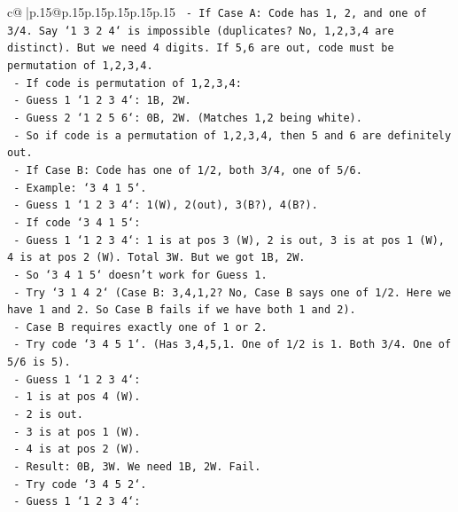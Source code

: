 \documentclass{article}
\begin{document}
{\begin{supertabular}{c@{$\;$}|p{.15\linewidth}@{}p{.15\linewidth}p{.15\linewidth}p{.15\linewidth}p{.15\linewidth}p{.15\linewidth}}
{{{\texttt{            {-} If Case A: Code has 1, 2, and one of 3/4. Say `1 3 2 4` is impossible (duplicates? No, 1,2,3,4 are distinct). But we need 4 digits. If 5,6 are out, code must be permutation of 1,2,3,4.} \\
\texttt{            {-} If code is permutation of 1,2,3,4:} \\
\texttt{                {-} Guess 1 `1 2 3 4`: 1B, 2W.} \\
\texttt{                {-} Guess 2 `1 2 5 6`: 0B, 2W. (Matches 1,2 being white).} \\
\texttt{                {-} So if code is a permutation of 1,2,3,4, then 5 and 6 are definitely out.} \\
\texttt{            {-} If Case B: Code has one of 1/2, both 3/4, one of 5/6.} \\
\texttt{                {-} Example: `3 4 1 5`.} \\
\texttt{                {-} Guess 1 `1 2 3 4`: 1(W), 2(out), 3(B?), 4(B?).} \\
\texttt{                    {-} If code `3 4 1 5`:} \\
\texttt{                    {-} Guess 1 `1 2 3 4`: 1 is at pos 3 (W), 2 is out, 3 is at pos 1 (W), 4 is at pos 2 (W). Total 3W. But we got 1B, 2W.} \\
\texttt{                    {-} So `3 4 1 5` doesn't work for Guess 1.} \\
\texttt{                {-} Try `3 1 4 2` (Case B: 3,4,1,2? No, Case B says one of 1/2. Here we have 1 and 2. So Case B fails if we have both 1 and 2).} \\
\texttt{                {-} Case B requires exactly one of 1 or 2.} \\
\texttt{                {-} Try code `3 4 5 1`. (Has 3,4,5,1. One of 1/2 is 1. Both 3/4. One of 5/6 is 5).} \\
\texttt{                {-} Guess 1 `1 2 3 4`:} \\
\texttt{                    {-} 1 is at pos 4 (W).} \\
\texttt{                    {-} 2 is out.} \\
\texttt{                    {-} 3 is at pos 1 (W).} \\
\texttt{                    {-} 4 is at pos 2 (W).} \\
\texttt{                    {-} Result: 0B, 3W. We need 1B, 2W. Fail.} \\
\texttt{                {-} Try code `3 4 5 2`.} \\
\texttt{                    {-} Guess 1 `1 2 3 4`:} \\
}}}
\end{supertabular}}
\end{document}
